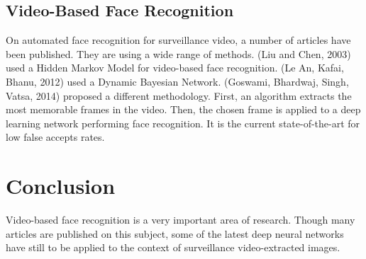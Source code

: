 \subsection{Video-Based Face Recognition}

On automated face recognition for surveillance video, a number of articles have been published. They are using a wide range of methods. (Liu and Chen, 2003) used a Hidden Markov Model for video-based face recognition. (Le An, Kafai, Bhanu, 2012) used a Dynamic Bayesian Network. (Goswami, Bhardwaj, Singh, Vatsa, 2014) proposed a different methodology. First, an algorithm extracts the most memorable frames in the video. Then, the chosen frame is applied to a deep learning network performing face recognition. It is the current state-of-the-art for low false accepts rates.

\section{Conclusion}

Video-based face recognition is a very important area of research. Though many articles are published on this subject, some of the latest deep neural networks have still to be applied to the context of surveillance video-extracted images.